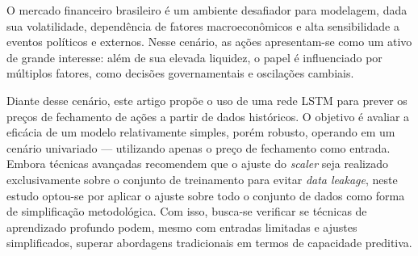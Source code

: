 \documentclass[conference]{IEEEtran}
\begin{document}

O mercado financeiro brasileiro é um ambiente desafiador para modelagem, dada sua volatilidade, dependência de fatores macroeconômicos e alta sensibilidade a eventos políticos e externos. Nesse cenário, as ações apresentam-se como um ativo de grande interesse: além de sua elevada liquidez, o papel é influenciado por múltiplos fatores, como decisões governamentais e oscilações cambiais.



Diante desse cenário, este artigo propõe o uso de uma rede LSTM para prever os preços de fechamento de ações a partir de dados históricos. O objetivo é avaliar a eficácia de um modelo relativamente simples, porém robusto, operando em um cenário univariado — utilizando apenas o preço de fechamento como entrada. Embora técnicas avançadas recomendem que o ajuste do \textit{scaler} seja realizado exclusivamente sobre o conjunto de treinamento para evitar \textit{data leakage}, neste estudo optou-se por aplicar o ajuste sobre todo o conjunto de dados como forma de simplificação metodológica. Com isso, busca-se verificar se técnicas de aprendizado profundo podem, mesmo com entradas limitadas e ajustes simplificados, superar abordagens tradicionais em termos de capacidade preditiva.
\end{document}
